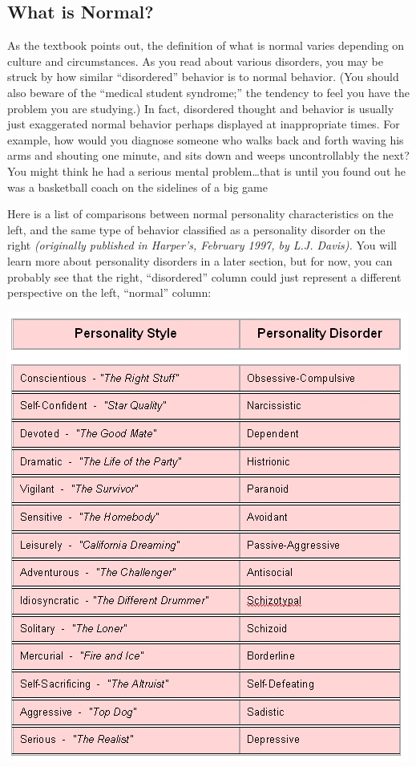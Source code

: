 \documentclass[
]{book}
\begin{document}
\hypertarget{what-is-normal}{%
\subsection*{What is Normal?}\label{what-is-normal}}

As the textbook points out, the definition of what is normal varies depending on culture and circumstances. As you read about various disorders, you may be struck by how similar ``disordered'' behavior is to normal behavior. (You should also beware of the ``medical student syndrome;'' the tendency to feel you have the problem you are studying.) In fact, disordered thought and behavior is usually just exaggerated normal behavior perhaps displayed at inappropriate times. For example, how would you diagnose someone who walks back and forth waving his arms and shouting one minute, and sits down and weeps uncontrollably the next? You might think he had a serious mental problem\ldots*that is until you found out he was a basketball coach on the sidelines of a big game

Here is a list of comparisons between normal personality characteristics on the left, and the same type of behavior classified as a personality disorder on the right \emph{(originally published in Harper's, February 1997, by L.J. Davis).} You will learn more about personality disorders in a later section, but for now, you can probably see that the right, ``disordered'' column could just represent a different perspective on the left, ``normal'' column:

\includegraphics{assets/unit_10/U10_image.jpg}
\end{document}
